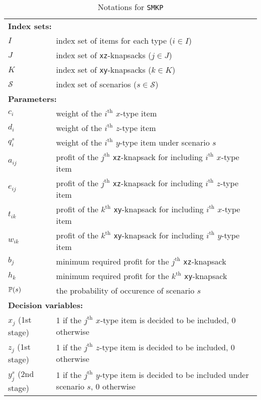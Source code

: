 \begin{table}[H]
	\caption{Notations for \texttt{SMKP}}
	\label{smkp:notation}
	\resizebox{\textwidth}{!}
	{
		\begin{tabular}{ll}
			\toprule
			\multicolumn{2}{l}{\textbf{Index sets:}} \\
			$I$ &  index set of items for each type ($i\in I$)\\ 
			$J$ &  index set of \texttt{xz}-knapsacks ($j \in J$)\\ 
			$K$ &  index set of \texttt{xy}-knapsacks ($k \in K$)\\
			$\mathcal{S}$ & index set of scenarios ($s\in \mathcal{S}$)\\ \midrule
			\multicolumn{2}{l}{\textbf{Parameters:}} \\
			$c_{i}$ 	& weight of the $i^{\mathrm{th}}$ $x$-type item 		\\ 
			$d_{i}$ 	& weight of the $i^{\mathrm{th}}$ $z$-type item  		\\ 
			$q_{i}^{s}$ & weight of the $i^{\mathrm{th}}$ $y$-type item under scenario $s$ 		\\ 
			$a_{ij}$	& profit of the $j^{\mathrm{th}}$ \texttt{xz}-knapsack for including $i^{\mathrm{th}}$ $x$-type item		\\
			$e_{ij}$	& profit of the $j^{\mathrm{th}}$ \texttt{xz}-knapsack for including $i^{\mathrm{th}}$ $z$-type item		\\
			$t_{ik}$	& profit of the $k^{\mathrm{th}}$ \texttt{xy}-knapsack for including $i^{\mathrm{th}}$ $x$-type item	\\
			$w_{ik}$	& profit of the $k^{\mathrm{th}}$ \texttt{xy}-knapsack for including $i^{\mathrm{th}}$ $y$-type item		\\
			$b_j$		& minimum required profit for the $j^{\mathrm{th}}$ \texttt{xz}-knapsack		\\
			$h_k$		& minimum required profit for the $k^{\mathrm{th}}$ \texttt{xy}-knapsack		\\
			$\operatorname*{\mathbb{P}}(s)$ 	& \textrm{the probability of occurence of scenario $s$} \\ \midrule
			\multicolumn{2}{l}{\textbf{Decision variables:}} \\
			$x_{j}$ (1st stage) & 1 if the $j^{\mathrm{th}}$ $x$-type item is decided to be included, 0 otherwise \\ 
			$z_{j}$ (1st stage) & 1 if the $j^{\mathrm{th}}$ $z$-type item is decided to be included, 0 otherwise \\ 
			$y_{j}^s$ (2nd stage)& 1 if the $j^{\mathrm{th}}$ $y$-type item is decided to be included under scenario $s$, 0 otherwise  \\
			\bottomrule
		\end{tabular}
	}
\end{table} 

